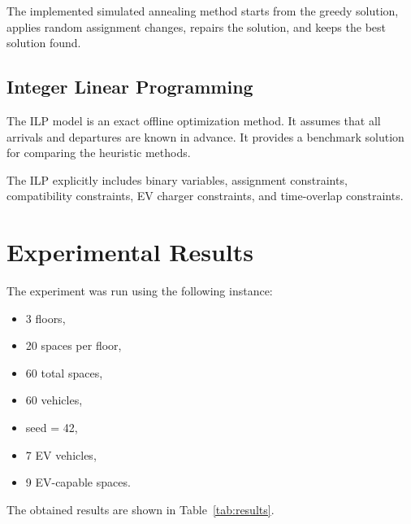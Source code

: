 \documentclass[12pt,a4paper]{article}
\begin{document}
The implemented simulated annealing method starts from the greedy solution, applies random assignment changes, repairs the solution, and keeps the best solution found.

\subsection{Integer Linear Programming}

The ILP model is an exact offline optimization method. It assumes that all arrivals and departures are known in advance. It provides a benchmark solution for comparing the heuristic methods.

The ILP explicitly includes binary variables, assignment constraints, compatibility constraints, EV charger constraints, and time-overlap constraints.

\section{Experimental Results}

The experiment was run using the following instance:

\begin{itemize}
    \item 3 floors,
    \item 20 spaces per floor,
    \item 60 total spaces,
    \item 60 vehicles,
    \item seed = 42,
    \item 7 EV vehicles,
    \item 9 EV-capable spaces.
\end{itemize}

The obtained results are shown in Table~\ref{tab:results}.

\begin{table}[H]
\centering
\caption{Comparison of Optimization Methods}
\label{tab:results}
\end{table}
\end{document}
